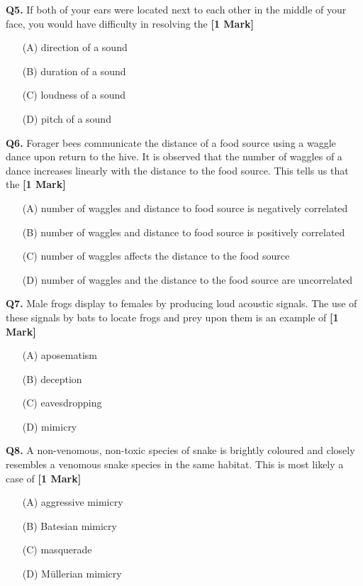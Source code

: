 \documentclass[11pt]{article}
\newcommand{\questiona}[2]{
    \noindent\textbf{Q#2.} #1 \hfill \textbf{[1 Mark]}
}
\begin{document}
\questiona{If both of your ears were located next to each other in the middle of your face, you would have difficulty in resolving the}{5}
\begin{enumerate}
    \item[(A)] direction of a sound
    \item[(B)] duration of a sound
    \item[(C)] loudness of a sound
    \item[(D)] pitch of a sound
\end{enumerate}
\vspace{0.5cm}

\questiona{Forager bees communicate the distance of a food source using a waggle dance upon return to the hive. It is observed that the number of waggles of a dance increases linearly with the distance to the food source. This tells us that the}{6}
\begin{enumerate}
    \item[(A)] number of waggles and distance to food source is negatively correlated
    \item[(B)] number of waggles and distance to food source is positively correlated
    \item[(C)] number of waggles affects the distance to the food source
    \item[(D)] number of waggles and the distance to the food source are uncorrelated
\end{enumerate}
\vspace{0.5cm}

\questiona{Male frogs display to females by producing loud acoustic signals. The use of these signals by bats to locate frogs and prey upon them is an example of}{7}
\begin{enumerate}
    \item[(A)] aposematism
    \item[(B)] deception
    \item[(C)] eavesdropping
    \item[(D)] mimicry
\end{enumerate}
\vspace{0.5cm}

\questiona{A non-venomous, non-toxic species of snake is brightly coloured and closely resembles a venomous snake species in the same habitat. This is most likely a case of}{8}
\begin{enumerate}
    \item[(A)] aggressive mimicry
    \item[(B)] Batesian mimicry
    \item[(C)] masquerade
    \item[(D)] Müllerian mimicry
\end{enumerate}
\vspace{0.5cm}
\end{document}
